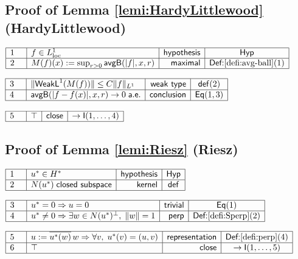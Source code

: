 \documentclass[11pt,reqno]{amsart}
\begin{document}
	\subsection*{Proof of Lemma \protect\ref{lemi:HardyLittlewood} (\textsf{HardyLittlewood})}
	\noindent$\begin{array}{|m{0.5cm}|l|r|c|}
	\hline
	1 & f\in L^{1}_{\mathrm{loc}} & \mathsf{hypothesis} & \mathsf{Hyp} \\ \hline
	2 & M(f)(x):=\sup_{r>0}\mathsf{avgB}(|f|,x,r) & \mathsf{maximal} & \textsf{Def:}\ref{defi:avg-ball}(1) \\ \hline
	\end{array}$
	\par\nointerlineskip\noindent$\begin{array}{|m{0.5cm}|l|r|c|}
	\hline
	3 & \|\mathsf{WeakL}^{1}(M(f))\|\le C\|f\|_{L^{1}} & \mathsf{weak\ type} & \mathsf{def}(2) \\ \hline
	4 & \mathsf{avgB}(|f-f(x)|,x,r)\to0\;\mathsf{a.e.} & \mathsf{conclusion} & \mathsf{Eq}(1,3) \\ \hline
	\end{array}$
	\par\nointerlineskip\noindent$\begin{array}{|m{0.5cm}|l|r|c|}
	\hline
	5 & \top & \mathsf{close} & \to\mathsf{I}(1,\dots,4) \\ \hline
	\end{array}$
	\medskip
	
	\subsection*{Proof of Lemma \protect\ref{lemi:Riesz} (\textsf{Riesz})}
	\noindent$\begin{array}{|m{0.5cm}|l|r|c|}
	\hline
	1 & u^{*}\in H^{*} & \mathsf{hypothesis} & \mathsf{Hyp} \\ \hline
	2 & N(u^{*})\;\mathsf{closed\ subspace} & \mathsf{kernel} & \mathsf{def} \\ \hline
	\end{array}$
	\par\nointerlineskip\noindent$\begin{array}{|m{0.5cm}|l|r|c|}
	\hline
	3 & u^{*}=0\Rightarrow u=0 & \mathsf{trivial} & \mathsf{Eq}(1) \\ \hline
	4 & u^{*}\neq0\Rightarrow\exists w\in N(u^{*})^{\perp},\;\|w\|=1 & \mathsf{perp} & \textsf{Def:}\ref{defi:Sperp}(2) \\ \hline
	\end{array}$
	\par\nointerlineskip\noindent$\begin{array}{|m{0.5cm}|l|r|c|}
	\hline
	5 & u:=\overline{u^{*}(w)}\,w\Rightarrow\forall v,\;u^{*}(v)=(u,v) & \mathsf{representation} & \textsf{Def:}\ref{defi:perp}(4) \\ \hline
	6 & \top & \mathsf{close} & \to\mathsf{I}(1,\dots,5) \\ \hline
	\end{array}$
	\medskip
	
\end{document}
